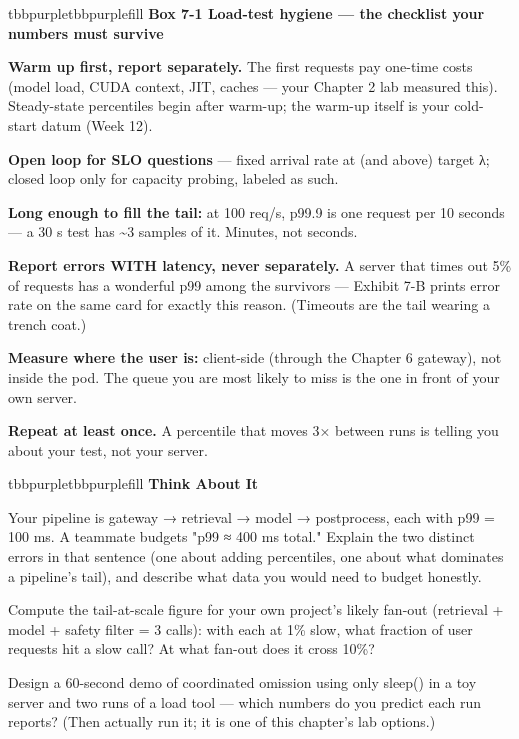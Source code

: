 \begin{calloutbox}{tbbpurple}{tbbpurplefill}
{\normalsize\bfseries\color{tbbx5B21B6}Box 7-1  Load-test hygiene — the checklist your numbers must survive}\par\vspace{3pt}
\begin{tbbitemize}
  \item \textbf{Warm up first, report separately.} The first requests pay one-time costs (model load, CUDA context, JIT, caches — your Chapter 2 lab measured this). Steady-state percentiles begin after warm-up; the warm-up itself is your cold-start datum (Week 12).
  \item \textbf{Open loop for SLO questions} — fixed arrival rate at (and above) target λ; closed loop only for capacity probing, labeled as such.
  \item \textbf{Long enough to fill the tail:} at 100 req/s, p99.9 is one request per 10 seconds — a 30 s test has \textasciitilde{}3 samples of it. Minutes, not seconds.
  \item \textbf{Report errors WITH latency, never separately.} A server that times out 5\% of requests has a wonderful p99 among the survivors — Exhibit 7-B prints error rate on the same card for exactly this reason. (Timeouts are the tail wearing a trench coat.)
  \item \textbf{Measure where the user is:} client-side (through the Chapter 6 gateway), not inside the pod. The queue you are most likely to miss is the one in front of your own server.
  \item \textbf{Repeat at least once.} A percentile that moves 3× between runs is telling you about your test, not your server.
\end{tbbitemize}
\end{calloutbox}

\vspace{3.0pt}

\begin{calloutbox}{tbbpurple}{tbbpurplefill}
{\normalsize\bfseries\color{tbbpurple}Think About It}\par\vspace{3pt}
\begin{tbbitemize}
  \item Your pipeline is gateway → retrieval → model → postprocess, each with p99 = 100 ms. A teammate budgets "p99 ≈ 400 ms total." Explain the two distinct errors in that sentence (one about adding percentiles, one about what dominates a pipeline's tail), and describe what data you would need to budget honestly.
  \item Compute the tail-at-scale figure for your own project's likely fan-out (retrieval + model + safety filter = 3 calls): with each at 1\% slow, what fraction of user requests hit a slow call? At what fan-out does it cross 10\%?
  \item Design a 60-second demo of coordinated omission using only sleep() in a toy server and two runs of a load tool — which numbers do you predict each run reports? (Then actually run it; it is one of this chapter's lab options.)
\end{tbbitemize}
\end{calloutbox}

